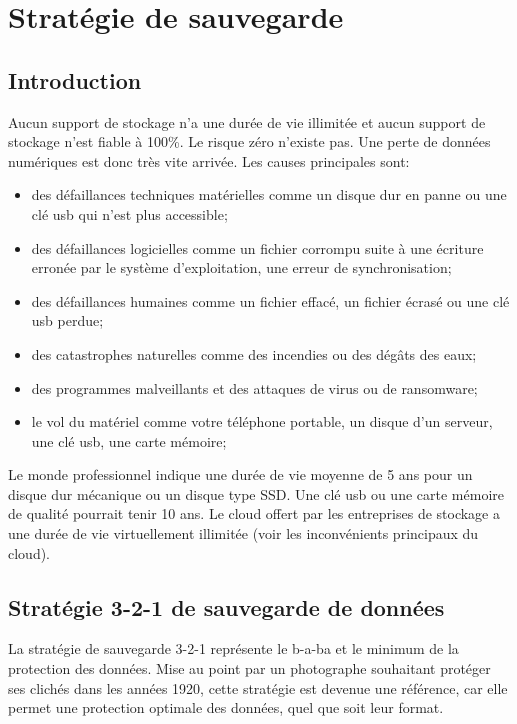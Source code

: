 \section{Stratégie de sauvegarde}
\subsection{Introduction}
Aucun support de stockage n’a une durée de vie illimitée et aucun support de stockage n’est fiable à 100\%. Le risque zéro n’existe pas. Une perte de données numériques est donc très vite arrivée. Les causes principales sont:
\begin{itemize}
	\item des défaillances techniques matérielles comme un disque dur en panne ou une clé usb qui n’est plus accessible;
	\item des défaillances logicielles comme un fichier corrompu suite à une écriture erronée par le système d’exploitation, une erreur de synchronisation;
	\item des défaillances humaines comme un fichier effacé, un fichier écrasé ou une clé usb perdue;
	\item des catastrophes naturelles comme des incendies ou des dégâts des eaux;
	\item des programmes malveillants et des attaques de virus ou de ransomware;
	\item le vol du matériel comme votre téléphone portable, un disque d’un serveur, une clé usb, une carte mémoire;
\end{itemize}
Le monde professionnel indique une durée de vie moyenne de 5 ans pour un disque dur mécanique ou un disque type SSD. Une clé usb ou une carte mémoire de qualité pourrait tenir 10 ans. Le cloud offert par les entreprises de stockage a une durée de vie virtuellement illimitée (voir les inconvénients principaux du cloud).

\subsection{Stratégie 3-2-1 de sauvegarde de données}

La stratégie de sauvegarde 3-2-1 représente le b-a-ba et le minimum de la protection des données. Mise au point par un photographe souhaitant protéger ses clichés dans les années 1920, cette stratégie est devenue une référence, car elle permet une protection optimale des données, quel que soit leur format.

